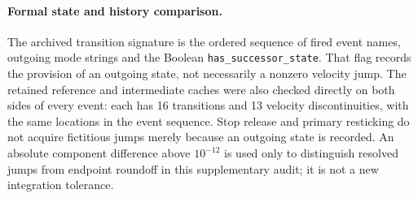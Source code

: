 \documentclass[11pt]{report}
\numberwithin{equation}{section}
\begin{document}
\paragraph{Formal state and history comparison.}
The archived transition signature is the ordered sequence of fired event
names, outgoing mode strings and the Boolean \texttt{has\_successor\_state}.
That flag records the provision of an outgoing state, not necessarily a
nonzero velocity jump. The retained reference and intermediate caches were also
checked directly on both sides of every event: each has 16 transitions and
13 velocity discontinuities, with the same locations in the event sequence.
Stop release and primary resticking do not acquire fictitious jumps merely
because an outgoing state is recorded. An absolute component difference
above $10^{-12}$ is used only to distinguish resolved jumps from endpoint
roundoff in this supplementary audit; it is not a new integration tolerance.
\end{document}
